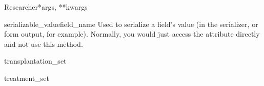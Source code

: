 \documentclass[letterpaper,10pt,english]{sphinxmanual}
\begin{document}
\begin{classdesc}{Researcher}{*args, **kwargs}
\begin{methoddesc}[Researcher]{serializable\_value}{field\_name}
Used to serialize a field's value (in the serializer, or form output,
for example). Normally, you would just access the attribute directly
and not use this method.
\end{methoddesc}

\hypertarget{data.models.Researcher.transplantation_set}{}\begin{memberdesc}[Researcher]{transplantation\_set}\end{memberdesc}

\hypertarget{data.models.Researcher.treatment_set}{}\begin{memberdesc}[Researcher]{treatment\_set}\end{memberdesc}
\end{classdesc}
\end{document}
